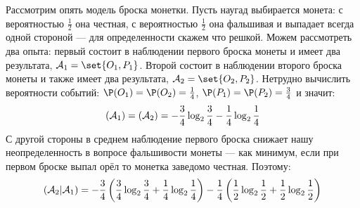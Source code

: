 \begin{example}
	Рассмотрим опять модель броска монетки. Пусть наугад выбирается монета: с вероятностью $\frac{1}{2}$ она честная, с вероятностью $\frac{1}{2}$ она фальшивая и выпадает всегда одной стороной --- для определенности скажем что решкой. Можем рассмотреть два опыта: первый состоит в наблюдении первого броска монеты и имеет два результата, $\mathcal{A}_1 = \set{O_1, P_1}$. Второй состоит в наблюдении второго броска монеты и также имеет два результата, $\mathcal{A}_2 = \set{O_2, P_2}$. Нетрудно вычислить вероятности событий: $\P(O_1) = \P(O_2) = \frac{1}{4}$, $\P(P_1) = \P(P_2) = \frac{3}{4}$ и значит:
	\[
		\relax(\mathcal{A}_1) = \relax(\mathcal{A}_2) = -\frac{3}{4}\log_2\frac{3}{4} - \frac{1}{4}\log_2\frac{1}{4}
	\]
	С другой стороны в среднем наблюдение первого броска снижает нашу неопределенность в вопросе фальшивости монеты --- как минимум, если при первом броске выпал орёл то монетка заведомо честная. Поэтому:
	\[
		\relax(\mathcal{A}_2 | \mathcal{A}_1) = -\frac{3}{4}\left(\frac{3}{4}\log_2\frac{3}{4} + \frac{1}{4}\log_2\frac{1}{4}\right) -\frac{1}{4}\left(\frac{1}{2}\log_2\frac{1}{2} + \frac{1}{2}\log_2\frac{1}{2}\right)
	\]
	
\end{example}

